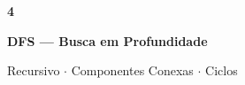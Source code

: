 \documentclass[aspectratio=169,10pt]{beamer}
\begin{document}
{
\begin{frame}[noframenumbering]
  \centering\vspace{1.2cm}
  {\fontsize{38}{46}\selectfont\bfseries\color{gemaBlue} 4}\par
  \vspace{0.25cm}
  {\Large\color{dfsColor}\bfseries DFS --- Busca em Profundidade}\par
  \vspace{0.15cm}
  {\color{gray}\small Recursivo $\cdot$ Componentes Conexas $\cdot$ Ciclos}
\end{frame}
}

\end{document}
